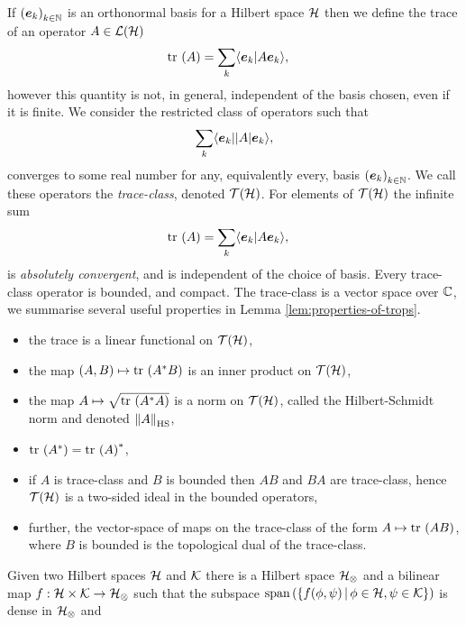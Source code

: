 If $\seq{\boe_k}[k\in\N]$ is an orthonormal basis for a Hilbert space $\mathcal{H}$ then we define the trace of an operator $A\in\bops[\hcal]$ 
\begin{align}
  \tr{A} &= \sum_k \braket{\boe_k}{A\boe_k},
\end{align}
however this quantity is not, in general, independent of the basis chosen, even if it is finite. We consider the restricted class of operators such that
\begin{align}
  \sum_k \langle \bm{e}_k|{\left\lvert{A}\right\rvert}\bm{e}_k\rangle,
\end{align}
converges to some real number for any, equivalently every, basis $\seq{\boe_k}[k\in\N]$. We call these operators the \emph{trace-class}, denoted $\trops[\hcal]$. For elements of $\trops[\hcal]$ the infinite sum
\begin{align}
  \tr{A} &= \sum_k \braket{\boe_k}{A\boe_k},
\end{align}
is \emph{absolutely convergent}, and is independent of the choice of basis. Every trace-class operator is bounded, and compact. The trace-class is a vector space over $\mathbb{C}$, we summarise several useful properties in Lemma \ref{lem:properties-of-trops}.
\begin{lem}
\label{lem:properties-of-trops}\leavevmode
\begin{itemize}
  \item the trace is a linear functional on $\trops[\hcal]$,
  \item the map $(A, B)\mapsto \tr{A^*B}$ is an inner product on $\trops[\hcal]$,
  \item the map $A\mapsto \sqrt{\tr{A^*A}}$ is a norm on $\trops[\hcal]$, called the Hilbert-Schmidt norm and denoted ${\left\lVert{A}\right\rVert}_{\text{HS}}$,
  \item $\tr{A^*} = \tr{A}^*$,
  \item if $A$ is trace-class and $B$ is bounded then $AB$ and $BA$ are trace-class, hence $\trops[\hcal]$ is a two-sided ideal in the bounded operators,
  \item further, the vector-space of maps on the trace-class of the form $A\mapsto\tr{AB}$, where $B$ is bounded is the topological dual of the trace-class.
\end{itemize}
\end{lem}
Given two Hilbert spaces $\mathcal{H}$ and $\mathcal{K}$ there is a Hilbert space $\mathcal{H}_\otimes$ and a bilinear map $f:\mathcal{H}\times\mathcal{K}\to\mathcal{H}_\otimes$ such that the subspace $\operatorname{span}\left(\left\{f(\phi,\psi)\,\middle|\,\phi\in\mathcal{H}, \psi\in\mathcal{K}\right\}\right)$ is dense in $\mathcal{H}_\otimes$ and 
